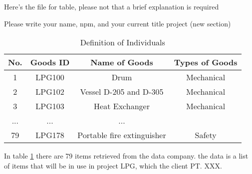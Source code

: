 Here's the file for table, please not that a brief explanation is required

Please write your name, npm, and your current title project (new section)


\begin{table}[h]
    \caption{Definition of Individuals}
    \centering
    \begin{tabular}{c c c c}
    \hline
    No. & Goods ID & Name of Goods & Types of Goods \\
    \hline
    1 & LPG100 & Drum & Mechanical \\
    2 & LPG102 & Vessel D-205 and D-305 & Mechanical \\
    3 & LPG103 & Heat Exchanger & Mechanical\\
    ... & ... & ... \\
    79 & LPG178 & Portable fire extinguisher & Safety \\
    \hline
    \end{tabular}
    \label{table}
\end{table}

\par In table \ref{table} there are 79 items retrieved from the data company. the data is a list of items that will be in use in project LPG, which the client PT. XXX. 
